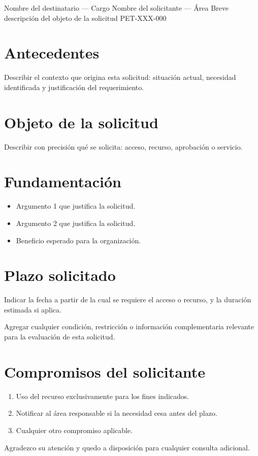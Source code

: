 \documentclass{../base/canon}
\begin{document}
\MemoBlock%
  {Nombre del destinatario — Cargo}%
  {Nombre del solicitante — Área}%
  {Breve descripción del objeto de la solicitud}%
  {PET-XXX-000}

\section{Antecedentes}

Describir el contexto que origina esta solicitud: situación actual, necesidad
identificada y justificación del requerimiento.

\section{Objeto de la solicitud}

Describir con precisión qué se solicita: acceso, recurso, aprobación o servicio.

\section{Fundamentación}

\begin{itemize}
  \item Argumento 1 que justifica la solicitud.
  \item Argumento 2 que justifica la solicitud.
  \item Beneficio esperado para la organización.
\end{itemize}

\section{Plazo solicitado}

Indicar la fecha a partir de la cual se requiere el acceso o recurso, y la
duración estimada si aplica.

\begin{ObservationBox}[Nota]
  Agregar cualquier condición, restricción o información complementaria relevante
  para la evaluación de esta solicitud.
\end{ObservationBox}

\section{Compromisos del solicitante}

\begin{enumerate}
  \item Uso del recurso exclusivamente para los fines indicados.
  \item Notificar al área responsable si la necesidad cesa antes del plazo.
  \item Cualquier otro compromiso aplicable.
\end{enumerate}

\vspace{12pt}
Agradezco su atención y quedo a disposición para cualquier consulta adicional.


\ContactSignature
\end{document}
